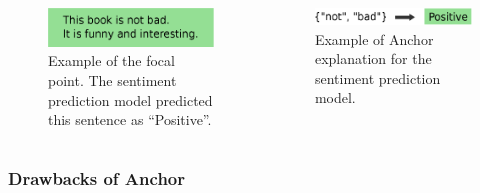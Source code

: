 \documentclass[aspectratio=169]{slide-en}
\begin{document}
\begin{frame}{}
  \begin{columns}[]
    \begin{column}{0.35\textwidth}
      \begin{figure}
        \centering
        \includegraphics[width=\textwidth]{example-instance}
        \caption{%
          Example of the focal point.
          The sentiment prediction model predicted this sentence as ``Positive''.
        }
      \end{figure}
    \end{column}
    \begin{column}{0.4\textwidth}
      \vspace{0.7em}
      \begin{figure}
        \includegraphics[width=\textwidth]{example-anchor}
        \vspace{-0.5em}
        \caption{%
          Example of Anchor explanation for the sentiment prediction model.
        }
      \end{figure}
    \end{column}
  \end{columns}
\end{frame}

\subsubsection{Drawbacks of Anchor}
\end{document}
